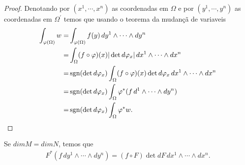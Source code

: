 \begin{proof} 
  Denotando por $(x^{1},\cdots,x^{n})$ as coordenadas em $\Omega$ e por $(y^{1},\cdots,y^{n})$ as coordenadas em $\Omega^{\prime}$ temos que usando o teorema da mudançã de variaveis
  \begin{align*}
    \int_{\varphi(\Omega)}w=&\int_{\varphi(\Omega)}f(y)\,dy^{1}\wedge\cdots\wedge dy^{n}\\
    =&\int_{\Omega}(f\circ\varphi)(x)|\det d\varphi_x|\, dx^{1}\wedge\cdots\wedge dx^{n}\\
    =&\operatorname{sgn}(\det d\varphi_x)\int_{\Omega}(f\circ\varphi)(x)\det d\varphi_x\,dx^{1}\wedge\cdots\wedge dx^{n}\\
    =&\operatorname{sgn}(\det d\varphi_x)\int_{\Omega}\varphi^{\ast}(f\,d^{1}\wedge\cdots\wedge dy^{n})\\
    =&\operatorname{sgn}(\det d\varphi_x)\int_{\Omega}\varphi^{\ast}w.
  \end{align*}
\end{proof}
\begin{note}
  Se $dim M=dim N$, temos que
  \begin{align*}
    F^{\ast}(f\, dy^{1}\wedge\cdots\wedge dy^{n})=(f\circ F)\det dF\, dx^{1}\wedge\cdots\wedge dx^{n}.
  \end{align*}
\end{note}
